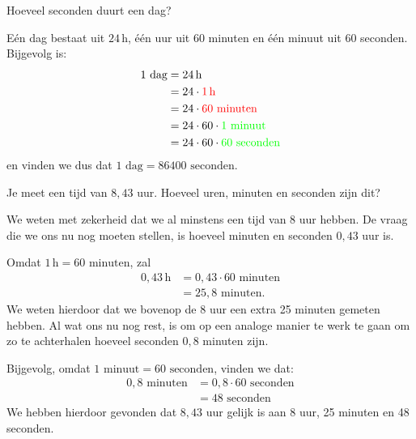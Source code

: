 \documentclass{ximera}
\begin{document}
\begin{example}[foldable=true,title={Voorbeeld: Aantal Seconden in een Dag}]\nl
    Hoeveel seconden duurt een dag?

    \begin{solution}\nl
        Eén dag bestaat uit $24\,\mathrm{h}$, één uur uit 60 minuten en één minuut uit 60 seconden. Bijgevolg is:
        \begin{align*}
        1 \text{ dag} & = 24 \, \mathrm{h} \\
        & = 24 \cdot \textcolor{red}{1 \, \mathrm{h}} \\
        & = 24 \cdot \textcolor{red}{60 \text{ minuten}} \\
        & = 24 \cdot 60 \cdot \textcolor{green}{1 \text{ minuut}} \\
        & = 24 \cdot 60 \cdot \textcolor{green}{60 \text{ seconden}}
        \end{align*}
        en vinden we dus dat $1 \text{ dag} = 86400 \text{ seconden}$.
    \end{solution}
\end{example}

\begin{example}[foldable=true,title={Voorbeeld: Uur naar uur, minuten en seconden omzetten}]\nl
    Je meet een tijd van $8{,}43$ uur. Hoeveel uren, minuten en seconden zijn dit?

    \begin{solution}\nl
        We weten met zekerheid dat we al minstens een tijd van 8 uur hebben. De vraag die we ons nu nog moeten stellen, is hoeveel minuten en seconden $0{,}43$ uur is.

        Omdat $1 \, \mathrm{h} = 60 \text{ minuten}$, zal 
        \begin{align*}
        0{,}43 \, \mathrm{h} & = 0{,}43 \cdot 60 \text{ minuten} \\
        & = 25{,}8 \text{ minuten}.
        \end{align*}
        We weten hierdoor dat we bovenop de 8 uur een extra 25 minuten gemeten hebben. Al wat ons nu nog rest, is om op een analoge manier te werk te gaan om zo te achterhalen hoeveel seconden $0{,}8$ minuten zijn.

        Bijgevolg, omdat $1 \text{ minuut} = 60 \text{ seconden}$, vinden we dat:
        \begin{align*}
        0{,}8 \text{ minuten} & = 0{,}8 \cdot 60 \text{ seconden} \\
        & = 48 \text{ seconden}
        \end{align*}
        We hebben hierdoor gevonden dat $8{,}43$ uur gelijk is aan 8 uur, 25 minuten en 48 seconden.
    \end{solution}
\end{example}
\end{document}
